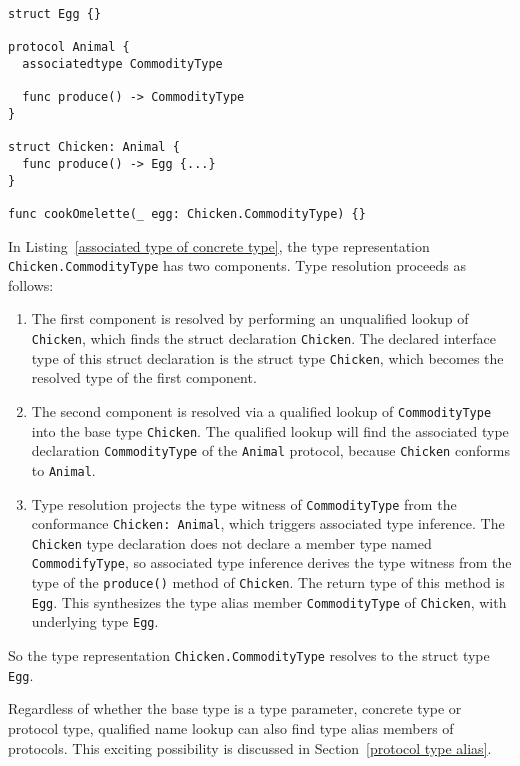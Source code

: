 \documentclass[../generics]{subfiles}
\begin{document}
\begin{listing}\label{associated type of concrete type}
\begin{Verbatim}
struct Egg {}

protocol Animal {
  associatedtype CommodityType

  func produce() -> CommodityType
}

struct Chicken: Animal {
  func produce() -> Egg {...}
}

func cookOmelette(_ egg: Chicken.CommodityType) {}
\end{Verbatim}
\end{listing}
\begin{example} In Listing~\ref{associated type of concrete type}, the type representation \texttt{Chicken.CommodityType} has two components. Type resolution proceeds as follows:
\begin{enumerate}
\item The first component is resolved by performing an unqualified lookup of \texttt{Chicken}, which finds the struct declaration \texttt{Chicken}. The declared interface type of this struct declaration is the struct type \texttt{Chicken}, which becomes the resolved type of the first component.

\item The second component is resolved via a qualified lookup of \texttt{CommodityType} into the base type \texttt{Chicken}. The qualified lookup will find the associated type declaration \texttt{CommodityType} of the \texttt{Animal} protocol, because \texttt{Chicken} conforms to \texttt{Animal}.

\item Type resolution projects the type witness of \texttt{CommodityType} from the conformance \texttt{Chicken:\ Animal}, which triggers associated type inference. The \texttt{Chicken} type declaration does not declare a member type named \texttt{CommodifyType}, so associated type inference derives the type witness from the type of the \texttt{produce()} method of \texttt{Chicken}. The return type of this method is \texttt{Egg}. This synthesizes the type alias member \texttt{CommodityType} of \texttt{Chicken}, with underlying type \texttt{Egg}.
\end{enumerate}
So the type representation \texttt{Chicken.CommodityType} resolves to the struct type \texttt{Egg}.
\end{example}

Regardless of whether the base type is a type parameter, concrete type or protocol type, qualified name lookup can also find type alias members of protocols. This exciting possibility is discussed in Section~\ref{protocol type alias}.
\end{document}
